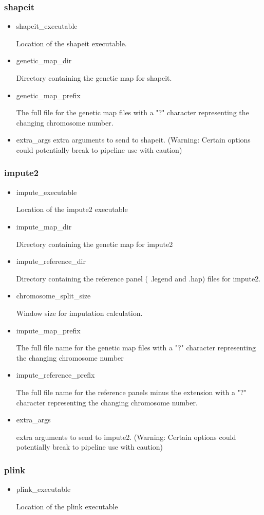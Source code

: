 \documentclass[a4paper,10pt]{article}
\begin{document}
\subsubsection{shapeit}
\begin{itemize}
\item shapeit\_executable

Location of the shapeit executable.
\item genetic\_map\_dir 

Directory containing the genetic map for shapeit.
\item genetic\_map\_prefix 

The full file for the genetic map files with a "?" character representing the changing chromosome number.
\item extra\_args 
extra arguments to send to shapeit. (Warning: Certain options could potentially break to pipeline use with caution)
\end{itemize}
\subsubsection{impute2}
\begin{itemize}
\item impute\_executable 

Location of the impute2 executable
\item impute\_map\_dir

Directory containing the genetic map for impute2
\item impute\_reference\_dir 

Directory containing the reference panel ( .legend and .hap) files for impute2.
\item chromosome\_split\_size

Window size for imputation calculation.
\item impute\_map\_prefix

The full file name for the genetic map files with a "?" character representing the changing chromosome number
\item impute\_reference\_prefix

The full file name for the reference panels minus the extension with a "?" character representing the changing chromosome number.
\item extra\_args

 extra arguments to send to impute2. (Warning: Certain options could potentially break to pipeline use with caution)
\end{itemize}
\subsubsection{plink}
\begin{itemize}
\item plink\_executable 

Location of the plink executable
\end{itemize}
\end{document}

